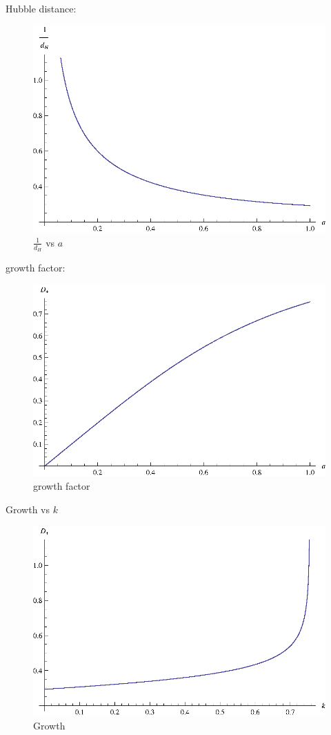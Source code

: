 \documentclass{article}
\begin{document}
Hubble distance:
\begin{figure}[!htbp]
\centering
\includegraphics[width=400pt]{P_LCDM_HubbleDistance.eps}
\caption{$\frac{1}{d_H}$ vs $a$}
\end{figure}

growth factor:
\begin{figure}[!htbp]
\centering
\includegraphics[width=400pt]{P_LCDM_Growth.eps}
\caption{growth factor}
\end{figure}

Growth vs $k$
\begin{figure}[!htbp]
\centering
\includegraphics[width=400pt]{P_LCDM_GrowthVSk.eps}
\caption{Growth}
\end{figure}
\end{document}
